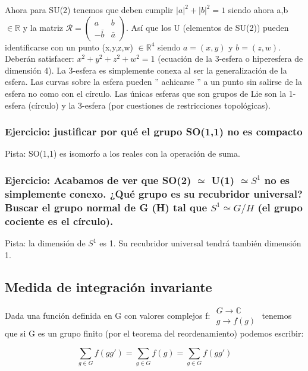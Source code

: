 \documentclass{article}
\begin{document}
     \bigskip
     Ahora para SU(2) tenemos que deben cumplir $|a|^2+|b|^2=1$ siendo ahora a,b $\in \mathds{R}$ y la matriz $\mathcal{R}= \left ( \begin{array}{cc}
         a &  b\\
         -\bar{b} & \bar{a} 
     \end{array}\right)$. Así que los U (elementos de SU(2)) pueden identificarse con un punto (x,y,z,w) $\in \mathds{R}^4$ siendo $a=(x,y)$ y $b=(z,w)$. Deberán satisfacer: $x^2 +y^2 + z^2 + w^2=1$ (ecuación de la 3-esfera o hiperesfera de dimensión 4). La 3-esfera es simplemente conexa al ser la generalización de la esfera. Las curvas sobre la esfera pueden '' achicarse '' a un punto sin salirse de la esfera no como con el círculo. Las únicas esferas que son grupos de Lie son la 1-esfera (círculo) y la 3-esfera (por cuestiones de restricciones topológicas).
     
     \subsubsection{Ejercicio: justificar por qué el grupo SO(1,1) no es compacto}
     
     Pista: SO(1,1) es isomorfo a los reales con la operación de suma.
     
     \subsubsection{Ejercicio: Acabamos de ver que SO(2) $\simeq$ U(1) $\simeq S^1$  no es simplemente conexo. ¿Qué grupo es su recubridor universal? Buscar el grupo normal de G (H) tal que $S^1 \simeq G/H$ (el grupo cociente es el círculo).}
     
     Pista: la dimensión de $S^1$ es 1. Su recubridor universal tendrá también dimensión 1.
     
     \subsection{Medida de integración invariante}
     
     Dada una función definida en G con valores complejos f: $\begin{array}{c}
         G \to \mathds{C}  \\
          g \to f(g)
     \end{array}$ tenemos que si G es un grupo finito (por el teorema del reordenamiento) podemos escribir:
     
     $$\sum _{g\in G} f(gg')=\sum _{g\in G} f(g)=\sum _{g\in G} f(gg')$$
     
\end{document}
